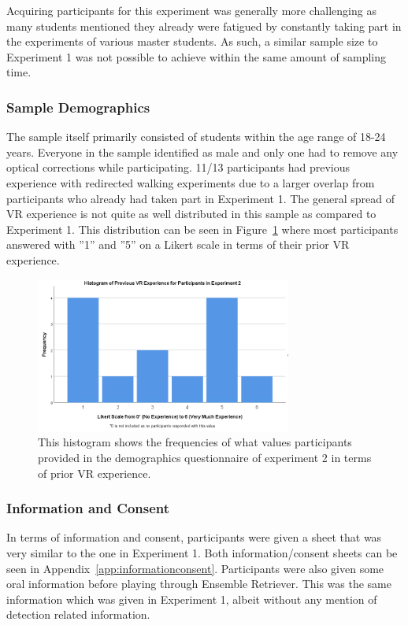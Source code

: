 Acquiring participants for this experiment was generally more challenging as many students mentioned they already were fatigued by constantly taking part in the experiments of various master students. As such, a similar sample size to Experiment 1 was not possible to achieve within the same amount of sampling time. 

\subsubsection{Sample Demographics}
The sample itself primarily consisted of students within the age range of 18-24 years. Everyone in the sample identified as male and only one had to remove any optical corrections while participating. 11/13 participants had previous experience with redirected walking experiments due to a larger overlap from participants who already had taken part in Experiment 1. The general spread of VR experience is not quite as well distributed in this sample as compared to Experiment 1. This distribution can be seen in Figure~\ref{fig:ex2PriorVRExperience} where most participants answered with ''1'' and ''5'' on a Likert scale in terms of their prior VR experience.

\begin{figure}[tbph]
    \centering
    \includegraphics[width=0.75\textwidth]{figures/graphs/PriorVRExperienceExperiment2.png}
    \caption[Histogram on Prior VR Experience of Participants in Experiment 2]{This histogram shows the frequencies of what values participants provided in the demographics questionnaire of experiment 2 in terms of prior VR experience.}
    \label{fig:ex2PriorVRExperience}
\end{figure}

\subsubsection{Information and Consent}
In terms of information and consent, participants were given a sheet that was very similar to the one in Experiment 1. Both information/consent sheets can be seen in Appendix~\ref{app:informationconsent}. Participants were also given some oral information before playing through Ensemble Retriever. This was the same information which was given in Experiment 1, albeit without any mention of detection related information. 

